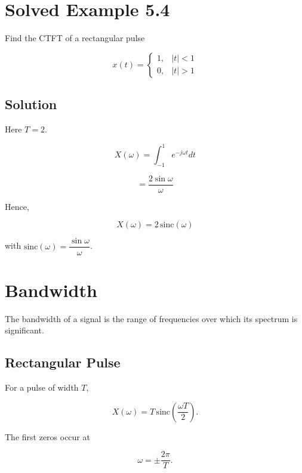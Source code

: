 
\section{Solved Example 5.4}

Find the CTFT of a rectangular pulse

\[
x(t)=
\begin{cases}
1, & |t|<1\\
0, & |t|>1
\end{cases}
\]


\subsection{Solution}

Here \(T=2\).

\[
X(\omega)=
\int_{-1}^{1}e^{-j\omega t}dt
\]

\[
=
\frac{2\sin\omega}{\omega}
\]

Hence,

\[
\boxed{
X(\omega)=2\,\mathrm{sinc}(\omega)
}
\]

with \(\mathrm{sinc}(\omega)=\dfrac{\sin\omega}{\omega}\).


\section{Bandwidth}

The bandwidth of a signal is the range of frequencies over which its spectrum is significant.


\subsection{Rectangular Pulse}

For a pulse of width \(T\),

\[
X(\omega)=
T\,\mathrm{sinc}\left(\frac{\omega T}{2}\right).
\]

The first zeros occur at

\[
\omega=\pm\frac{2\pi}{T}.
\]


